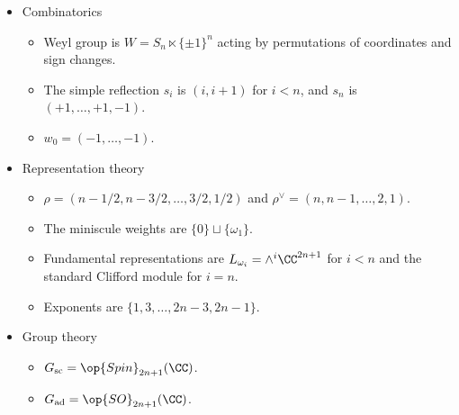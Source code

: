 \documentclass{article}
\begin{document}
\begin{itemize}
\begin{itemize}
		\item The simple roots are $\{e_i-e_{i+1}:i\}\cup\{e_n\}$. Set $\alpha_i\coloneqq e_i-e_{i+1}$ and $\alpha_n\coloneqq e_n$.
		\item Dynkin diagram:
		\[\begin{tikzcd}[cramped]
			{\alpha_1} & {\alpha_2} & \cdots & {\alpha_{n-1}} & {\alpha_n}
			\arrow[no head, from=1-1, to=1-2]
			\arrow[no head, from=1-2, to=1-3]
			\arrow[no head, from=1-3, to=1-4]
			\arrow[Leftarrow, nfold, from=1-5, to=1-4]
		\end{tikzcd}\]
		\item The fundamental weights are $\{\omega_i\}_i$ where $\omega_i\coloneqq({1,\ldots,1},0,\ldots,0)$ has $i$ ones for $i<n$ and $\omega_n\coloneqq\frac12(1,\ldots,1)$.
		\item Maximal root $\theta=e_1+e_2$.
	\end{itemize}
	\item Combinatorics
	\begin{itemize}
		\item Weyl group is $W=S_{n}\ltimes\{\pm1\}^n$ acting by permutations of coordinates and sign changes.
		\item The simple reflection $s_i$ is $(i,i+1)$ for $i<n$, and $s_n$ is $(+1,\ldots,+1,-1)$.
		\item $w_0=(-1,\ldots,-1)$.
	\end{itemize}
	\item Representation theory
	\begin{itemize}
		\item $\rho=(n-1/2,n-3/2,\ldots,3/2,1/2)$ and $\rho^\lor=(n,n-1,\ldots,2,1)$.
		\item The miniscule weights are $\{0\}\sqcup\{\omega_1\}$.
		\item Fundamental representations are $L_{\omega_i}=\land^i\CC^{2n+1}$ for $i<n$ and the standard Clifford module for $i=n$.
		\item Exponents are $\{1,3,\ldots,2n-3,2n-1\}$.
	\end{itemize}
	\item Group theory
	\begin{itemize}
		\item $G_{\mathrm{sc}}=\op{Spin}_{2n+1}(\CC)$.
		\item $G_{\mathrm{ad}}=\op{SO}_{2n+1}(\CC)$.
	\end{itemize}
\end{itemize}

\newpage
\end{document}
